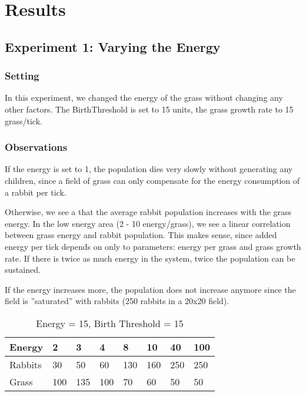 \documentclass[11pt]{article}
\begin{document}
\section{Results}

\subsection{Experiment 1: Varying the Energy}

\subsubsection{Setting}
In this experiment, we changed the energy of the grass without changing any other factors.
The BirthThreshold is set to 15 units, the grass growth rate to 15 grass/tick.

\subsubsection{Observations}
If the energy is set to 1, the population dies very slowly without generating any children, since a field of grass can only compensate for the energy consumption of a rabbit per tick.

Otherwise, we see a that the average rabbit population increases with the grass energy.
In the low energy area (2 - 10 energy/grass), we see a linear correlation between grass energy and rabbit population.
This makes sense, since added energy per tick depends on only to parameters: energy per grass and grass growth rate.
If there is twice as much energy in the system, twice the population can be sustained.

If the energy increases more, the population does not increase anymore since the field is ''saturated'' with rabbits (250 rabbits in a 20x20 field).
\begin{table}[]
	\centering
	\caption{Energy = 15, Birth Threshold = 15}
	\begin{tabular}{@{}llllllll@{}}
		\toprule
		Energy  & 2   & 3   & 4   & 8   & 10  & 40  & 100 \\ \midrule
		Rabbits & 30  & 50  & 60  & 130 & 160 & 250 & 250 \\
		Grass   & 100 & 135 & 100 & 70  & 60  & 50  & 50  \\ \bottomrule
	\end{tabular}
\end{table}
\end{document}
